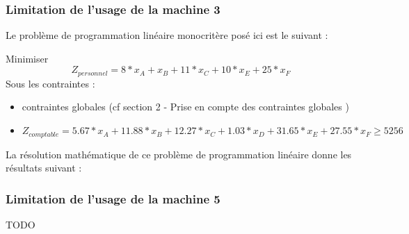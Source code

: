 \documentclass[12pt]{article}
\begin{document}
\subsubsection{Limitation de l'usage de la machine 3}
Le problème de programmation linéaire monocritère posé ici est le suivant :
\begin{tcolorbox}
Minimiser
\begin{equation*}
 Z_{personnel}= 8*x_{A} + x_{B} + 11*x_{C} + 10*x_{E} + 25*x_{F}
\end{equation*}
Sous les contraintes :
\begin{itemize}
\item contraintes globales (cf section 2 - Prise en compte des contraintes globales )
\item $ Z_{comptable}= 5.67*x_{A} +11.88*x_{B} +12.27*x_{C} +1.03*x_{D} +31.65*x_{E} +27.55*x_{F} \geq 5256$
\end{itemize}
\end{tcolorbox}
La résolution mathématique de ce problème de programmation linéaire donne les résultats suivant :\\
\subsubsection{Limitation de l'usage de la machine 5}
TODO
\end{document}
